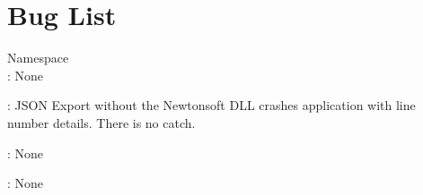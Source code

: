 \chapter{Bug List}
\hypertarget{bug}{}\label{bug}

\begin{DoxyRefList}
\item[Namespace \doxylink{namespace_focus_app}{Focus\+App} ]\hfill \\
\label{bug__bug000001}%
%
\+: None 

\label{bug__bug000002}%
%
\+: JSON Export without the Newtonsoft DLL crashes application with line number details. There is no catch. 

\label{bug__bug000003}%
%
\+: None 

\label{bug__bug000004}%
%
\+: None 
\end{DoxyRefList}
